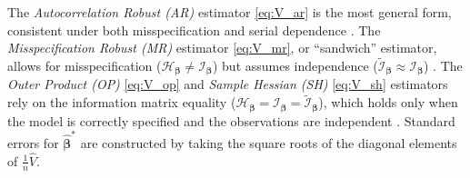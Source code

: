 \documentclass[00-main.tex]{subfiles}
\begin{document}
The \emph{Autocorrelation Robust (AR)} estimator \eqref{eq:V_ar} is the most general form, consistent under both misspecification and serial dependence \citep{newey_simple_1987}. The \emph{Misspecification Robust (MR)} estimator \eqref{eq:V_mr}, or ``sandwich'' estimator, allows for misspecification ($\mathcal{H}_{\bm\beta} \neq \mathscr{I}_{\bm\beta}$) but assumes independence ($\tilde{\mathscr{I}}_{\bm\beta} \approx \mathscr{I}_{\bm\beta}$) \citep{white_maximum_1982}. The \emph{Outer Product (OP)} \eqref{eq:V_op} and \emph{Sample Hessian (SH)} \eqref{eq:V_sh} estimators rely on the information matrix equality ($\mathcal{H}_{\bm\beta} = \mathscr{I}_{\bm\beta} = \tilde{\mathscr{I}}_{\bm\beta}$), which holds only when the model is correctly specified and the observations are independent \citep[Theorem~10.5]{hansen_probability_2022}. Standard errors for $\hat{\bm\beta}^*$ are constructed by taking the square roots of the diagonal elements of $\frac{1}{n}\widehat{V}$.
\end{document}
